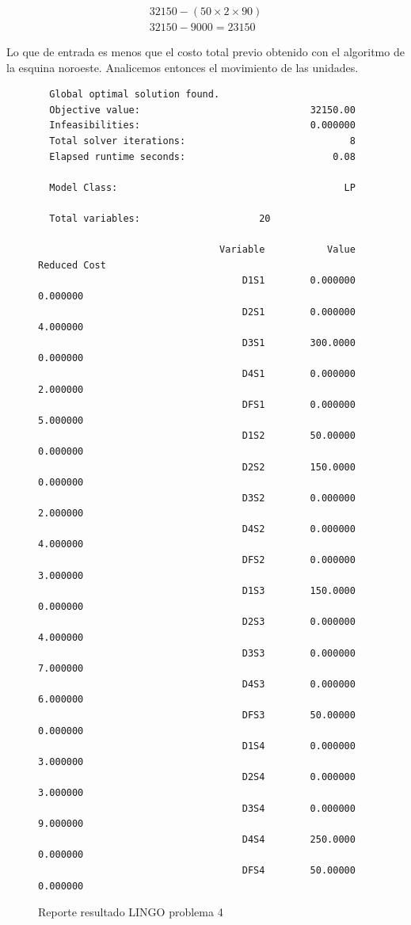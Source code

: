 \documentclass[12pt]{article}  %
\begin{document}
\begin{align}
32150 - (50 \times 2 \times 90) \\ 
32150 - 9000 = 23150
\end{align}

Lo que de entrada es menos que el costo total previo obtenido con el algoritmo de la esquina noroeste.
Analicemos entonces el movimiento de las unidades.

\begin{figure}[H]
	\centering
	\caption{Reporte resultado LINGO problema 4}
	\label{fig:reporteProb4}
	\begin{verbatim}
  Global optimal solution found.
  Objective value:                              32150.00
  Infeasibilities:                              0.000000
  Total solver iterations:                             8
  Elapsed runtime seconds:                          0.08

  Model Class:                                        LP

  Total variables:                     20

                                Variable           Value        Reduced Cost
                                    D1S1        0.000000            0.000000
                                    D2S1        0.000000            4.000000
                                    D3S1        300.0000            0.000000
                                    D4S1        0.000000            2.000000
                                    DFS1        0.000000            5.000000
                                    D1S2        50.00000            0.000000
                                    D2S2        150.0000            0.000000
                                    D3S2        0.000000            2.000000
                                    D4S2        0.000000            4.000000
                                    DFS2        0.000000            3.000000
                                    D1S3        150.0000            0.000000
                                    D2S3        0.000000            4.000000
                                    D3S3        0.000000            7.000000
                                    D4S3        0.000000            6.000000
                                    DFS3        50.00000            0.000000
                                    D1S4        0.000000            3.000000
                                    D2S4        0.000000            3.000000
                                    D3S4        0.000000            9.000000
                                    D4S4        250.0000            0.000000
                                    DFS4        50.00000            0.000000
	\end{verbatim}
\end{figure}
\end{document}
